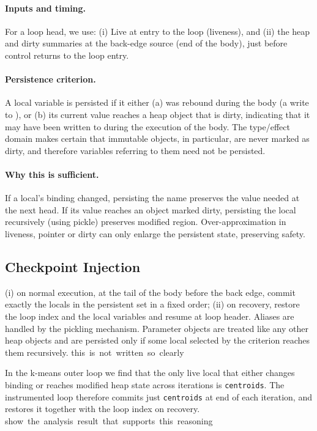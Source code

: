 \paragraph{Inputs and timing.}
For a loop head, we use:
(i) Live \tLOCALS at entry to the loop (liveness), and
(ii) the heap and dirty summaries at the back-edge source (end of the body), just before control returns to the loop entry.

\paragraph{Persistence criterion.}
A local variable is persisted if it either (a) was rebound during the body (a write to \tLOCALS), or (b) its current value reaches a heap object that is dirty, indicating that it may have been written to during the execution of the body.
The type/effect domain makes certain that immutable objects, in particular, are never marked as dirty, and therefore variables referring to them need not be persisted.

\paragraph{Why this is sufficient.}
If a local's binding changed, persisting the name preserves the value needed at the next head.
If its value reaches an object marked dirty, persisting the local recursively (using \eg pickle) preserves modified region.
Over-approximation in liveness, pointer or dirty can only enlarge the persistent state, preserving safety.

\subsection{Checkpoint Injection}

(i) on normal execution, at the tail of the body before the back edge, commit exactly the locals in the persistent set in a fixed order;
(ii) on recovery, restore the loop index and the local variables and resume at loop header. Aliases are handled by the pickling mechanism.
Parameter objects are treated like any other heap objects and are persisted only if some local selected by the criterion reaches them recursively.
\si{this is not written so clearly}

\begin{example}
In the k-means outer loop we find that the only live local that either changes binding or reaches modified heap state across iterations is \texttt{centroids}. The instrumented loop therefore commits just \texttt{centroids} at end of each iteration, and restores it together with the loop index on recovery.
\si{show the analysis result that supports this reasoning}
\end{example}
